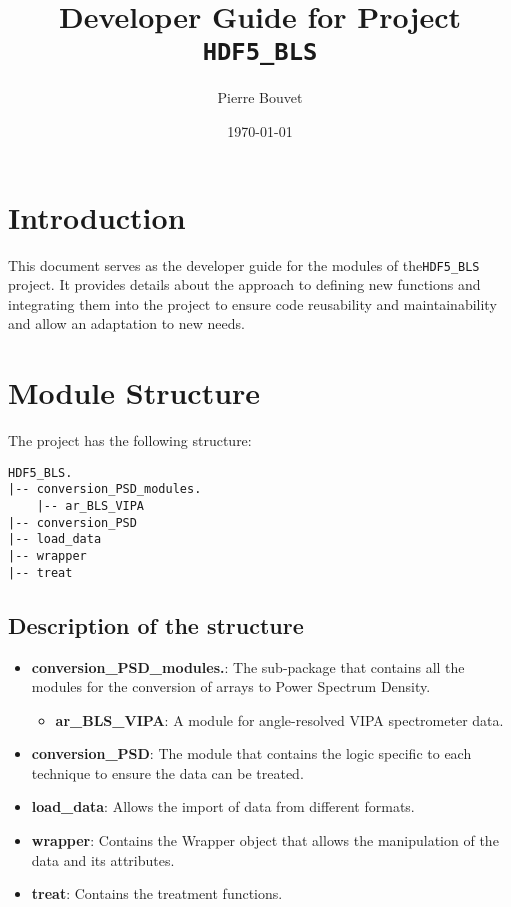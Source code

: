 \documentclass[a4paper,12pt]{article}
\title{Developer Guide for Project \texttt{HDF5\_BLS}}
\author{Pierre Bouvet}
\date{\today}
\begin{document}
\maketitle

\tableofcontents

\section{Introduction}
This document serves as the developer guide for the modules of the\texttt{HDF5\_BLS} project. It provides details about the approach to defining new functions and integrating them into the project to ensure code reusability and maintainability and allow an adaptation to new needs.

\section{Module Structure}
The project has the following structure:
\begin{verbatim}
HDF5_BLS.
|-- conversion_PSD_modules.
    |-- ar_BLS_VIPA
|-- conversion_PSD
|-- load_data
|-- wrapper
|-- treat
\end{verbatim}

\subsection{Description of the structure}
\begin{itemize}
    \item \textbf{conversion\_PSD\_modules.}: The sub-package that contains all the modules for the conversion of arrays to Power Spectrum Density.
        \begin{itemize}
            \item \textbf{ar\_BLS\_VIPA}: A module for angle-resolved VIPA spectrometer data.
        \end{itemize}
    \item \textbf{conversion\_PSD}: The module that contains the logic specific to each technique to ensure the data can be treated.
    \item \textbf{load\_data}: Allows the import of data from different formats.
    \item \textbf{wrapper}: Contains the Wrapper object that allows the manipulation of the data and its attributes.
    \item \textbf{treat}: Contains the treatment functions.
\end{itemize}
\end{document}
